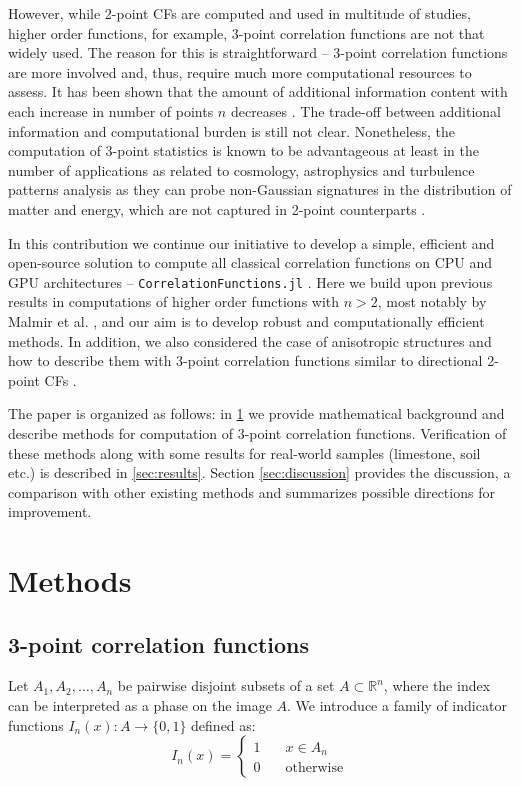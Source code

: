 \documentclass[reprint,amsmath,amssymb,aps,pre,showkeys,showpacs]{revtex4-1}
\newcommand{\code}[1]{\colorbox{light-gray}{\texttt{#1}}}
\begin{document}
However, while 2-point CFs are computed and used in multitude of studies, higher
order functions, for example, 3-point correlation functions are not that widely
used. The reason for this is straightforward -- 3-point correlation functions
are more involved and, thus, require much more computational resources to
assess. It has been shown that the amount of additional information content with
each increase in number of points $n$ decreases \cite{yao1993high,Gommes2}. The
trade-off between additional information and computational burden is still not
clear. Nonetheless, the computation of 3-point statistics is known to be
advantageous at least in the number of applications as related to cosmology,
astrophysics and turbulence patterns analysis as they can probe non-Gaussian
signatures in the distribution of matter and energy, which are not captured in
2-point counterparts
\cite{TakadaJain,hopkins2013stars,gorbunova2016precessing,yoo2022non}.

In this contribution we continue our initiative to develop a simple, efficient
and open-source solution to compute all classical correlation functions on CPU
and GPU architectures -- \code{CorrelationFunctions.jl} \cite{CFsjlpaper}. Here
we build upon previous results in computations of higher order functions with
$n > 2$, most notably by Malmir et al. \cite{malmir2018}, and our aim is to
develop robust and computationally efficient methods. In addition, we also
considered the case of anisotropic structures and how to describe them with
3-point correlation functions similar to directional 2-point CFs
\cite{10.1063/1.4867611,EPL1}.

The paper is organized as follows: in \cref{sec:methods} we provide
mathematical background and describe methods for computation of 3-point
correlation functions. Verification of these methods along with some results for
real-world samples (limestone, soil etc.) is described in
\cref{sec:results}. Section \ref{sec:discussion} provides the discussion, a
comparison with other existing methods and summarizes possible directions for
improvement.

\section{Methods}
\label{sec:methods}
\subsection{3-point correlation functions}
Let $A_1, A_2, \dots, A_n$ be pairwise disjoint subsets of a set
$A \subset \mathbb{R}^n$, where the index can be interpreted as a phase on the
image $A$. We introduce a family of indicator functions
$I_n(x) : A \rightarrow \{0,1\}$ defined as:
\begin{equation}
  I_n(x) = \left\{
  \begin{array}{ll}
    1 & \quad x \in A_n \\
    0 & \quad \text{otherwise}
  \end{array}
  \right.
\end{equation}
\end{document}
